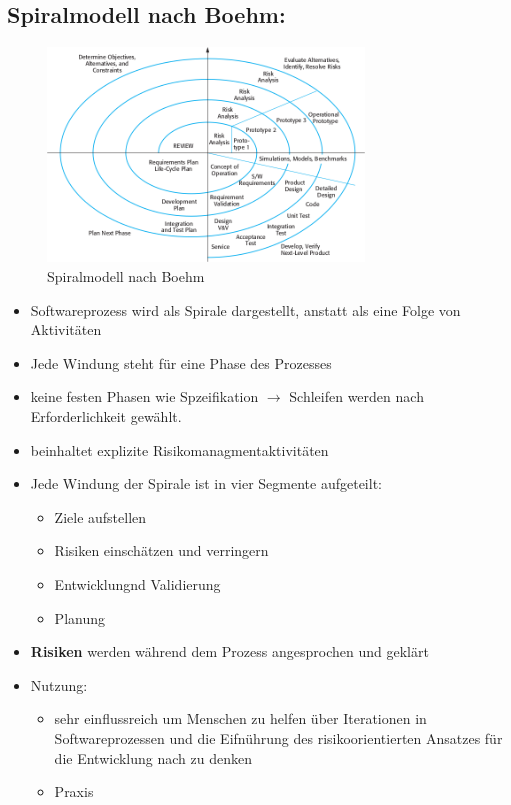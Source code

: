 \subsection{Spiralmodell nach Boehm:}
\begin{figure}[h]
    \centering
    \includegraphics[width=0.75\textwidth]{mainmatter/pics/boehm.png}
    \caption{Spiralmodell nach Boehm}
\end{figure}

\begin{itemize}
    \item Softwareprozess wird als Spirale dargestellt, anstatt als eine Folge von Aktivitäten 
    \item Jede Windung steht für eine Phase des Prozesses
    \item keine festen Phasen wie Spzeifikation $\rightarrow$ Schleifen werden nach Erforderlichkeit gewählt.
    \item beinhaltet explizite Risikomanagmentaktivitäten
    \item Jede Windung der Spirale ist in vier Segmente aufgeteilt:
    \begin{itemize}
        \item Ziele aufstellen
        \item Risiken einschätzen und verringern
        \item Entwicklungnd Validierung
        \item Planung
    \end{itemize}
    \item \textbf{Risiken} werden während dem Prozess angesprochen und geklärt
    \item Nutzung:
    \begin{itemize}
        \item sehr einflussreich um Menschen zu helfen über Iterationen in Softwareprozessen und die Eifnührung des risikoorientierten Ansatzes für die Entwicklung nach zu denken
        \item Praxis
    \end{itemize} 
\end{itemize}





